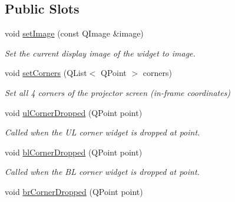 \subsection*{Public Slots}
\begin{DoxyCompactItemize}
\item 
void \hyperlink{classTrackVideoWidget_a11ea118c76dfa1a9d68e94e808c34d1a}{set\+Image} (const Q\+Image \&image)\hypertarget{classTrackVideoWidget_a11ea118c76dfa1a9d68e94e808c34d1a}{}\label{classTrackVideoWidget_a11ea118c76dfa1a9d68e94e808c34d1a}

\begin{DoxyCompactList}\small\item\em Set the current display image of the widget to image. \end{DoxyCompactList}\item 
void \hyperlink{classTrackVideoWidget_acb2f0df1f0857e71e68df3748fb968fa}{set\+Corners} (Q\+List$<$ Q\+Point $>$ corners)\hypertarget{classTrackVideoWidget_acb2f0df1f0857e71e68df3748fb968fa}{}\label{classTrackVideoWidget_acb2f0df1f0857e71e68df3748fb968fa}

\begin{DoxyCompactList}\small\item\em Set all 4 corners of the projector screen (in-\/frame coordinates) \end{DoxyCompactList}\item 
void \hyperlink{classTrackVideoWidget_a856730ade1ab79a2e1ff0e2570fa35db}{ul\+Corner\+Dropped} (Q\+Point point)\hypertarget{classTrackVideoWidget_a856730ade1ab79a2e1ff0e2570fa35db}{}\label{classTrackVideoWidget_a856730ade1ab79a2e1ff0e2570fa35db}

\begin{DoxyCompactList}\small\item\em Called when the UL corner widget is dropped at point. \end{DoxyCompactList}\item 
void \hyperlink{classTrackVideoWidget_af2e2b70e9d7057352a01f3fc4cf1af1c}{bl\+Corner\+Dropped} (Q\+Point point)\hypertarget{classTrackVideoWidget_af2e2b70e9d7057352a01f3fc4cf1af1c}{}\label{classTrackVideoWidget_af2e2b70e9d7057352a01f3fc4cf1af1c}

\begin{DoxyCompactList}\small\item\em Called when the BL corner widget is dropped at point. \end{DoxyCompactList}\item 
void \hyperlink{classTrackVideoWidget_a29c78146cdbe1423e97a343db9697d36}{br\+Corner\+Dropped} (Q\+Point point)\hypertarget{classTrackVideoWidget_a29c78146cdbe1423e97a343db9697d36}{}\label{classTrackVideoWidget_a29c78146cdbe1423e97a343db9697d36}


\end{DoxyCompactItemize}
